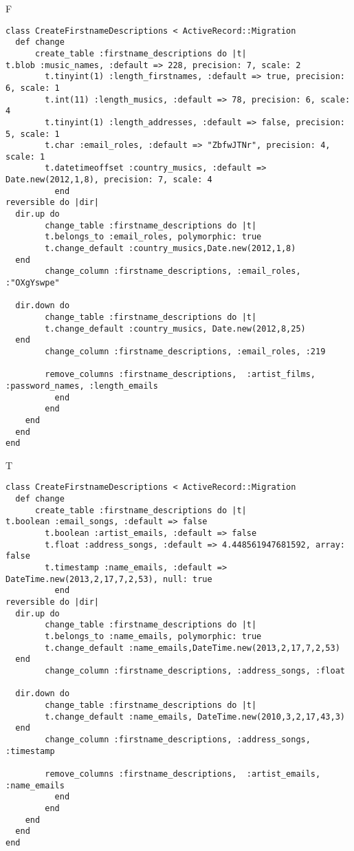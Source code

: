 F
\begin{verbatim}
class CreateFirstnameDescriptions < ActiveRecord::Migration
  def change
	  create_table :firstname_descriptions do |t|
t.blob :music_names, :default => 228, precision: 7, scale: 2
		t.tinyint(1) :length_firstnames, :default => true, precision: 6, scale: 1
		t.int(11) :length_musics, :default => 78, precision: 6, scale: 4
		t.tinyint(1) :length_addresses, :default => false, precision: 5, scale: 1
		t.char :email_roles, :default => "ZbfwJTNr", precision: 4, scale: 1
		t.datetimeoffset :country_musics, :default => Date.new(2012,1,8), precision: 7, scale: 4
		  end
reversible do |dir|
  dir.up do
		change_table :firstname_descriptions do |t|
		t.belongs_to :email_roles, polymorphic: true
 		t.change_default :country_musics,Date.new(2012,1,8)
  end
 		change_column :firstname_descriptions, :email_roles, :"OXgYswpe"
   
  dir.down do
		change_table :firstname_descriptions do |t|
		t.change_default :country_musics, Date.new(2012,8,25)
  end
 		change_column :firstname_descriptions, :email_roles, :219
   
		remove_columns :firstname_descriptions,  :artist_films, :password_names, :length_emails 
	      end
	    end
    end 
  end
end

\end{verbatim}

T
\begin{verbatim}
class CreateFirstnameDescriptions < ActiveRecord::Migration
  def change
	  create_table :firstname_descriptions do |t|
t.boolean :email_songs, :default => false
		t.boolean :artist_emails, :default => false
		t.float :address_songs, :default => 4.448561947681592, array: false
		t.timestamp :name_emails, :default => DateTime.new(2013,2,17,7,2,53), null: true
		  end
reversible do |dir|
  dir.up do
		change_table :firstname_descriptions do |t|
		t.belongs_to :name_emails, polymorphic: true
 		t.change_default :name_emails,DateTime.new(2013,2,17,7,2,53)
  end
 		change_column :firstname_descriptions, :address_songs, :float
   
  dir.down do
		change_table :firstname_descriptions do |t|
		t.change_default :name_emails, DateTime.new(2010,3,2,17,43,3)
  end
 		change_column :firstname_descriptions, :address_songs, :timestamp
   
		remove_columns :firstname_descriptions,  :artist_emails, :name_emails 
	      end
	    end
    end 
  end
end

\end{verbatim}

